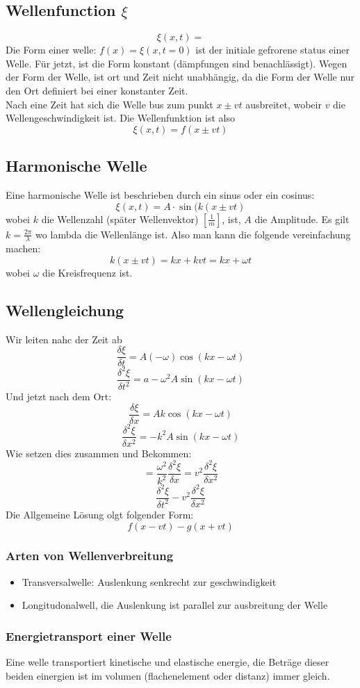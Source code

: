 \documentclass{article}
\begin{document}
\subsection{Wellenfunction $\xi$}
\[\xi(x,t)=\]
Die Form einer welle: $f(x)=\xi(x,t=0)$ ist der initiale gefrorene status einer Welle. Für jetzt, ist die Form konstant (dämpfungen sind benachlässigt). Wegen der Form der Welle, ist ort und Zeit nicht unabhängig, da die Form der Welle nur den Ort definiert bei einer konstanter Zeit.\\
Nach eine Zeit hat sich die Welle bus zum punkt $x\pm vt$ ausbreitet, wobeir $v$ die Wellengeschwindigkeit ist. Die Wellenfunktion ist also\[\xi(x,t)=f(x\pm vt)\]
\subsection{Harmonische Welle}
Eine harmonische Welle ist beschrieben durch ein sinus oder ein cosinus:\[\xi(x,t)=A\cdot\sin(k(x\pm vt)\] wobei $k$ die Wellenzahl (später Wellenvektor) $\left[\frac{1}{m}\right]$, ist, $A$ die Amplitude. Es gilt $k=\frac{2\pi}{\lambda}$ wo lambda die Wellenlänge ist. Also man kann die folgende vereinfachung machen:
\[k(x\pm vt)=kx+kvt=kx+\omega t\]
wobei $\omega$ die Kreisfrequenz ist.\\
\subsection{Wellengleichung}
Wir leiten nahc der Zeit ab
\[\frac{\delta\xi}{\delta t}=A(-\omega)\cos(kx-\omega t)\]
\[\frac{\delta^2 \xi}{\delta t^2}=a-\omega^2A\sin(kx-\omega t)\]
Und jetzt nach dem Ort:
\[\frac{\delta\xi}{\delta x}=Ak\cos(kx-\omega t)\]
\[\frac{\delta^2 \xi}{\delta x^2}=-k^2A\sin(kx-\omega t)\]
Wie setzen dies zusammen und Bekommen:
\[=\frac{\omega^2}{k^2}\frac{\delta^2\xi}{\delta x}=v^2\frac{\delta^2\xi}{\delta x^2}\]
\[\frac{\delta^2 \xi}{\delta t^2}-v^2\frac{\delta^2\xi}{\delta x^2}\]
Die Allgemeine Lösung olgt folgender Form:
\[f(x-vt)-g(x+vt)\]
\subsubsection{Arten von Wellenverbreitung}
\begin{itemize}
\item{Transversalwelle: Auslenkung senkrecht zur geschwindigkeit}
\item{Longitudonalwell, die Auslenkung ist parallel zur ausbreitung der Welle}
\end{itemize}
\subsubsection{Energietransport einer Welle}
Eine welle transportiert kinetische und elastische energie, die Beträge dieser beiden einergien ist im volumen (flachenelement oder distanz) immer gleich.
\end{document}
